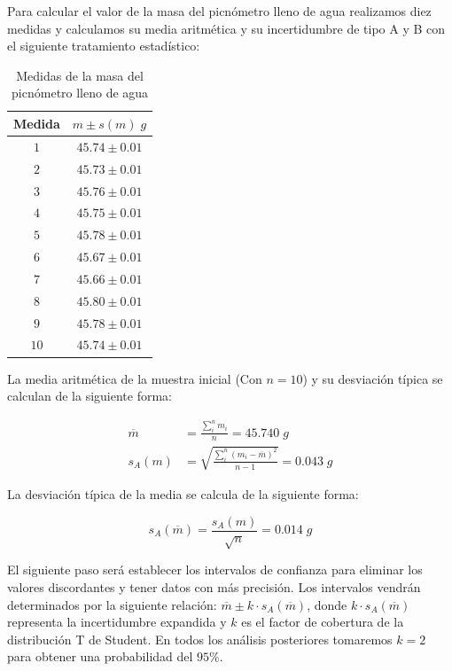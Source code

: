 \documentclass[a4paper,12pt,titlepage]{report}
\begin{document}
\par Para calcular el valor de la masa del picnómetro lleno de agua realizamos diez medidas y calculamos su media aritmética y su incertidumbre de tipo A y B con el siguiente tratamiento estadístico:

\begin{table}[h!]
    \centering
    \begin{tabular}{|c|c|}
    \hline
    Medida & $m \pm s(m)\; g$  \\ \hline
    $1$    & $45.74 \pm 0.01$ \\ \hline
    $2$    & $45.73 \pm 0.01$ \\ \hline
    $3$    & $45.76 \pm 0.01$ \\ \hline
    $4$    & $45.75 \pm 0.01$ \\ \hline
    $5$    & $45.78 \pm 0.01$ \\ \hline
    $6$    & $45.67 \pm 0.01$ \\ \hline
    $7$    & $45.66 \pm 0.01$ \\ \hline
    $8$    & $45.80 \pm 0.01$ \\ \hline
    $9$    & $45.78 \pm 0.01$ \\ \hline
    $10$   & $45.74 \pm 0.01$ \\ \hline
    \end{tabular}
    \caption{Medidas de la masa del picnómetro lleno de agua}
    \label{Pic Agua}
    \end{table}

\newpage

La media aritmética de la muestra inicial (Con $n=10$) y su desviación típica se calculan de la siguiente forma:

\begin{align}
    \overline{m} &= \frac{\sum_{i}^n m_{i}}{n} = 45.740 \; g 
    \label{Media1} \\
    s_{A}(m) &= \sqrt{\frac{\sum_{i}^n (m_i-\overline{m})^2}{n-1}} = 0.043 \; g
    \label{Desviación Típica de la muestra}
\end{align}

La desviación típica de la media se calcula de la siguiente forma:

\begin{equation}
    s_{A}(\overline{m}) = \frac{s_{A}(m)}{\sqrt{n}} = 0.014 \; g
    \label{Desv_T_agua}
\end{equation}


El siguiente paso será establecer los intervalos de confianza para eliminar los valores discordantes y tener datos con más precisión. Los intervalos vendrán determinados por la siguiente relación: $\overline{m} \pm k \cdot s_{A}(\overline{m})$, donde $k \cdot s_{A}(\overline{m})$ representa la incertidumbre expandida y $k$ es el factor de cobertura de la distribución T de Student. En todos los análisis posteriores tomaremos $k=2$ para obtener una probabilidad del $95 \%$.
\end{document}
